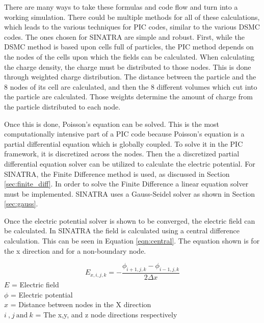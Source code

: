 \indent There are many ways to take these formulas and code flow and turn into a working simulation. There could be multiple methods for all of these calculations, which leads to the various techniques for PIC codes, similar to the various DSMC codes. The ones chosen for SINATRA are simple and robust. First, while the DSMC method is based upon cells full of particles, the PIC method depends on the nodes of the cells upon which the fields can be calculated. When calculating the charge density, the charge must be distributed to those nodes. This is done through weighted charge distribution. The distance between the particle and the 8 nodes of its cell are calculated, and then the 8 different volumes which cut into the particle are calculated. Those weights determine the amount of charge from the particle distributed to each node. \par

\indent Once this is done, Poisson's equation can be solved. This is the most computationally intensive part of a PIC code because Poisson's equation is a partial differential equation which is globally coupled. To solve it in the PIC framework, it is discretized across the nodes. Then the a discretized partial differential equation solver can be utilized to calculate the electric potential. For SINATRA, the Finite Difference method is used, as discussed in Section \ref{sec:finite_diff}. In order to solve the Finite Difference a linear equation solver must be implemented. SINATRA uses a Gauss-Seidel solver as shown in Section \ref{sec:gauss}. \par

\indent Once the electric potential solver is shown to be converged, the electric field can be calculated. In SINATRA the field is calculated using a central difference calculation. This can be seen in Equation \ref{eqn:central}. The equation shown is for the x direction and for a non-boundary node. \par

\begin{equation}
    \label{eqn:central}
    E_{x,i,j,k} = - \frac{\phi_{i+1,j,k} - \phi_{i-1,j,k}}{2 \Delta x}
\end{equation}
\(E\) = Electric field \\
\(\phi\) = Electric potential \\
\(x\) = Distance between nodes in the X direction \\
\(i \: \text{,} \: j \: \text{and} \: k\) = The x,y, and z node directions respectively  \par

